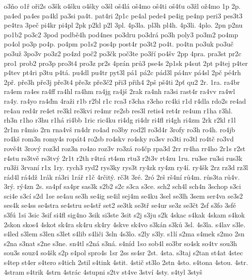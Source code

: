 {o3\v no
o1\v r
o\v ri2s
o3\v sk
o4\v sku
o4\v sky
o3\v sl
o\v s4l\'a
o\v s4mo
o\v s4ti
o\v s4\v tu
o3\v zl
o\v z4mo
1p
2p.
pa4ed
pa4es
pa4kl
pa3si
pa4t.
pat4ri
2p1c
pe4al
pede4
pe4ig
pe4np
peri3
pes3t3
pe4tra
3pe\v c
pi4kr
pi4pl
2pk
p2kl
p2l
3pl.
4p3la.
pl3h
pl4h.
4p3li.
4plo.
2pn
p2nu
po1b2
po3c2
3pod
podb\v e4h
pod4nes
po3dru
po3dr\'a
po3h
poly3
po3m2
po4mp
po4ol
po3p
po4p.
po4pm
po1s2
pos4p
post4r
po3t2
po4t.
po4tn
po3uk
po3u\v c
po3u\v z
3po3v
po3z2
po4zd
po\v c2
po3\v ck
po\v c3te
po3\v r\'i
po4\v sv
2pp
4pra.
pra3st
pr2c
pro1
prob2
pro3p
pro3t4
pro3z
pr2s
4pr\'an
pr\r u3
pse4s
2p1sk
p4sut
2pt
p4tej
p4ter
p4tev
pt4ri
p3tu
p4t\'a.
pu4dl
pu4tr
pyt3l
p\'a1
p\'a2c
p\'ad3l
p\'a4nv
p\'a4sl
2p\v c
p\'e4rh
2p\v r.
p\v re3h
p\v re3j
p\v re3t4
p\v re3z
p\v re3\v c2
p\v ri3
p\v rih4
2p\v s
p\v s4ti
2p\v t
qu2
2r.
1ra.
ra4br
ra4em
ra4es
ra4ff
ra4hl
ra4hm
ra4jg
ra4j\v s
2rak
ra4nh
ra3si
rast4r
ra4vv
ra4wl
ra4y.
ra4yo
ra4\v dm
4ra\v zi
r1b
r2bl
r1c
rca3
r3cha
r3cho
rc4ki
r1d
r4dla
rdo2s
re4ad
re4au
red4r
re4et
re3kl
re3kvi
re4mr
re2sb
res3l
retis4
ret4r
re4um
r1ha
r3hl.
rh3n
r1ho
r3hu
r1h\'a
ri4bb
1ric
ric4ku
ri4dg
ri4dr
ri4fl
ri4gh
ri4zm
2rk
r2kl
r1l
2r1m
r4mio
2rn
rna4v\v s
rn4dr
ro4ad
ro3by
rod2l
ro3d4r
3rofy
ro3h
ro4h.
ro4jb
ro4k\v s
rom3n
romy4s
rop\'at4
ro2sb
ro4skv
ro4sky
ro3sv
ro3ti
ro3tl
ro4t\v c
ro3vd
rov\v e4t
3rov\'y
roz3d
roz3n
ro4zo
roz3v
ro3z\'a
ro4\v cp
rpa3d
2rr
rr4ha
rr4ho
2r1s
r2st
r4stu
rs3tv\v e
rs3tv\'y
2r1t
r2th
r4tr\'a
rt4sm
rtu3
r2t3v
rt4zu
1ru.
ru3se
ru3si
rus3k
ru3\v zi
3rvan\'i
r1x
1ry.
rych3
ryd2
rys3ky
rys3t
ry4zk
ry4zn
ry4\'i.
ry4\v sk
2rz
rz3d
rz3l
r\'ad4l
r\'a4d\v z
1r\'ak
r\'a3ri
1r\'a\v r
r1\v c
4r\v cit\'y.
r\v c3t
3r\'e.
2r\'o
2r\v s
r\v s4n\'i
r\r u4m.
r\r us3ta
r\r u4v.
3r\'y.
r\'y4zn
2s.
sa4pf
sa4pr
sas3k
s2b2
s2c
s3ca
s3ce.
sch2
sch4l
sch4n
3schop
s3ci
sci4e
s3c\'i
s2d
1se
se4au
se3h
se4ig
se4il
sej4m
se4ku
3sel
se3lh
3sem
ser4va
se3s2
ses4k
se4ss
se4stra
se4stru
se4st\v r
set2
se3tk
se3t\v r
se4ur
se3z
se3\v ct
2sf
s3fo
3sf\'e
s3f\'u
1si
3sic
3sif
si4fl
sig4no
3sik
si3ste
3sit
s2j
s3ju
s2k
4skac
s4kak
4skam
s4kok
2skon
skos4
4skot
sk4ra
sk4ru
sk4ry
4skve
sk4vo
s3k\'an
s3k\r u
3sl.
4s3la.
s4lav
s3le.
s4led
s3lem
s3len
s3let
s4lib
s4li\v ci
3sln
4s3lo.
s2ly
s3ly.
s1l\'i
s2ma
s4mek
s2mo
2sn
s2na
s3nat
s2ne
s3ne.
sn4tl
s2n\'a
s3n\'a.
s4n\'id
1so
sob4l
so3br
so4sk
so4tv
sou3h
sou3s
souz4
so4\v sk
s2p
s4pol
spro4s
1sr
2ss
ss4sr
2st.
4sta.
s3taj
s2tan
st4at
4stec
s4tep
st4er
s4tero
s4tich
2stil
s4tink
4stit.
4sti\v c
st3lo
2stn
4sto.
s4tona
4stou.
4str.
4stram
s4trik
4strn
4str\'ac
4stupni
s2tv
st4ve
3stv\'i
4sty.
s4tyl
3sty\v s
}
